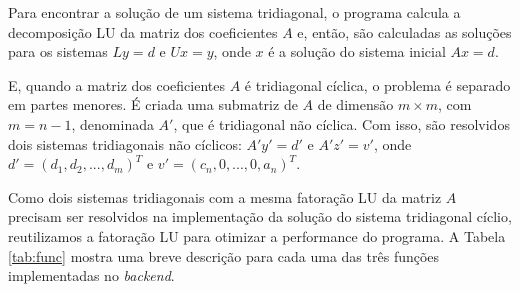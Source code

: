 \documentclass[a4,12pt]{horizon-theme}
\begin{document}



Para encontrar a solução de um sistema tridiagonal, o programa calcula a decomposição LU da matriz dos coeficientes $A$ e, então, são calculadas as soluções para os sistemas $Ly = d$ e $Ux = y$, onde $x$ é a solução do sistema inicial $Ax = d$.

E, quando a matriz dos coeficientes $A$ é tridiagonal cíclica, o problema é separado em partes menores. É criada uma submatriz de $A$ de dimensão $m \times m$, com $m = n-1$, denominada $A'$, que é tridiagonal não cíclica. Com isso, são resolvidos dois sistemas tridiagonais não cíclicos: $A'y' = d'$ e $A'z' = v'$, onde $d' = (d_1, d_2, ..., d_m)^T$ e $v' = (c_n, 0, ..., 0, a_n)^T$.

Como dois sistemas tridiagonais com a mesma fatoração LU da matriz $A$ precisam ser resolvidos na implementação da solução do sistema tridiagonal cíclio, reutilizamos a fatoração LU para otimizar a performance do programa. A Tabela \ref{tab:func} mostra uma breve descrição para cada uma das três funções implementadas no \emph{backend}.
\end{document}
